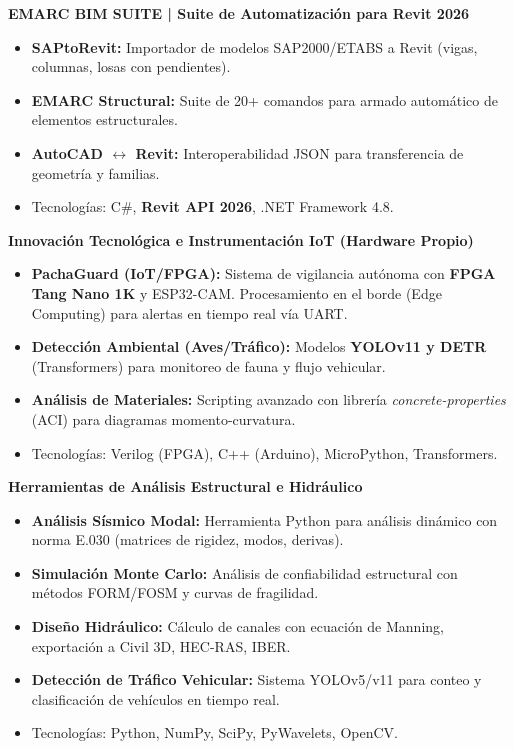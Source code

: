 \documentclass[10pt, a4paper]{article}
\begin{document}
\vspace{1mm}

\textbf{EMARC BIM SUITE | Suite de Automatización para Revit 2026}
\begin{itemize}
    \item \textbf{SAPtoRevit:} Importador de modelos SAP2000/ETABS a Revit (vigas, columnas, losas con pendientes).
    \item \textbf{EMARC Structural:} Suite de 20+ comandos para armado automático de elementos estructurales.
    \item \textbf{AutoCAD $\leftrightarrow$ Revit:} Interoperabilidad JSON para transferencia de geometría y familias.
    \item Tecnologías: C\#, \textbf{Revit API 2026}, .NET Framework 4.8.
\end{itemize}

\vspace{1mm}

\textbf{Innovación Tecnológica e Instrumentación IoT (Hardware Propio)}
\begin{itemize}
    \item \textbf{PachaGuard (IoT/FPGA):} Sistema de vigilancia autónoma con \textbf{FPGA Tang Nano 1K} y ESP32-CAM. Procesamiento en el borde (Edge Computing) para alertas en tiempo real vía UART.
    \item \textbf{Detección Ambiental (Aves/Tráfico):} Modelos \textbf{YOLOv11 y DETR} (Transformers) para monitoreo de fauna y flujo vehicular.
    \item \textbf{Análisis de Materiales:} Scripting avanzado con librería \textit{concrete-properties} (ACI) para diagramas momento-curvatura.
    \item Tecnologías: Verilog (FPGA), C++ (Arduino), MicroPython, Transformers.
\end{itemize}

\vspace{1mm}

\textbf{Herramientas de Análisis Estructural e Hidráulico}
\begin{itemize}
    \item \textbf{Análisis Sísmico Modal:} Herramienta Python para análisis dinámico con norma E.030 (matrices de rigidez, modos, derivas).
    \item \textbf{Simulación Monte Carlo:} Análisis de confiabilidad estructural con métodos FORM/FOSM y curvas de fragilidad.
    \item \textbf{Diseño Hidráulico:} Cálculo de canales con ecuación de Manning, exportación a Civil 3D, HEC-RAS, IBER.
    \item \textbf{Detección de Tráfico Vehicular:} Sistema YOLOv5/v11 para conteo y clasificación de vehículos en tiempo real.
    \item Tecnologías: Python, NumPy, SciPy, PyWavelets, OpenCV.
\end{itemize}
\end{document}
